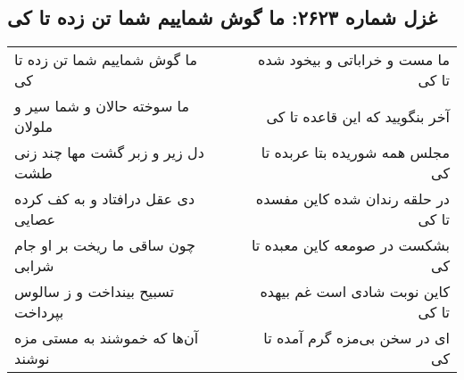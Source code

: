 \begin{center}
\section*{غزل شماره ۲۶۲۳: ما گوش شماییم شما تن زده تا کی}
\label{sec:2623}
\begin{longtable}{l p{0.5cm} r}
ما گوش شماییم شما تن زده تا کی
&&
ما مست و خراباتی و بیخود شده تا کی
\\
ما سوخته حالان و شما سیر و ملولان
&&
آخر بنگویید که این قاعده تا کی
\\
دل زیر و زبر گشت مها چند زنی طشت
&&
مجلس همه شوریده بتا عربده تا کی
\\
دی عقل درافتاد و به کف کرده عصایی
&&
در حلقه رندان شده کاین مفسده تا کی
\\
چون ساقی ما ریخت بر او جام شرابی
&&
بشکست در صومعه کاین معبده تا کی
\\
تسبیح بینداخت و ز سالوس بپرداخت
&&
کاین نوبت شادی است غم بیهده تا کی
\\
آن‌ها که خموشند به مستی مزه نوشند
&&
ای در سخن بی‌مزه گرم آمده تا کی
\\
\end{longtable}
\end{center}
